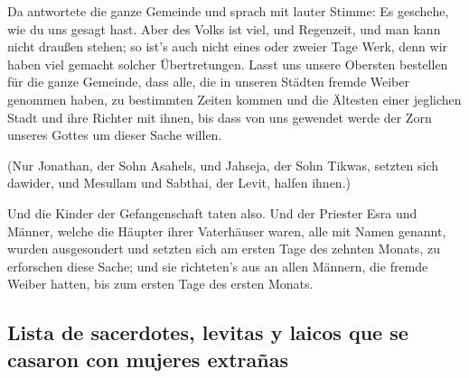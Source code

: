  Da antwortete die ganze Gemeinde und sprach mit lauter
Stimme: Es geschehe, wie du uns gesagt hast.  Aber des
Volks ist viel, und Regenzeit, und man kann nicht draußen stehen; so
ist's auch nicht eines oder zweier Tage Werk, denn wir haben viel
gemacht solcher Übertretungen.  Lasst uns unsere Obersten
bestellen für die ganze Gemeinde, dass alle, die in unseren Städten
fremde Weiber genommen haben, zu bestimmten Zeiten kommen und die
Ältesten einer jeglichen Stadt und ihre Richter mit ihnen, bis dass von
uns gewendet werde der Zorn unseres Gottes um dieser Sache willen.

 (Nur Jonathan, der Sohn Asahels, und Jahseja, der Sohn
Tikwas, setzten sich dawider, und Mesullam und Sabthai, der Levit,
halfen ihnen.)

 Und die Kinder der Gefangenschaft taten also. Und der
Priester Esra und Männer, welche die Häupter ihrer Vaterhäuser waren,
alle mit Namen genannt, wurden ausgesondert und setzten sich am ersten
Tage des zehnten Monats, zu erforschen diese Sache;  und
sie richteten's aus an allen Männern, die fremde Weiber hatten, bis zum
ersten Tage des ersten Monats.

\hypertarget{lista-de-sacerdotes-levitas-y-laicos-que-se-casaron-con-mujeres-extrauxf1as}{%
\subsection{Lista de sacerdotes, levitas y laicos que se casaron con
mujeres
extrañas}\label{lista-de-sacerdotes-levitas-y-laicos-que-se-casaron-con-mujeres-extrauxf1as}}

